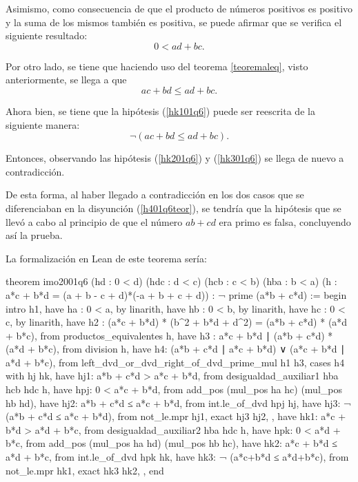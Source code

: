 \begin{demostracion}
\begin{itemize}
    Asimismo, como consecuencia de que el producto de números positivos
    es positivo y la suma de los mismos también es positiva, se puede
    afirmar que se verifica el siguiente resultado:
    \begin{equation}
      0<ad+bc.
    \end{equation}

    Por otro lado, se tiene que haciendo uso del teorema \ref{teoremaleq},
    visto anteriormente, se llega a que
    \begin{equation}\tag{hk2}\label{hk201q6}
      ac+bd≤ad+bc.
    \end{equation}

    Ahora bien, se tiene que la hipótesis (\ref{hk101q6}) puede ser
    reescrita de la siguiente manera:
    \begin{equation}\tag{hk3}\label{hk301q6}
      ¬(ac+bd≤ad+bc).
    \end{equation}

    Entonces, observando las hipótesis (\ref{hk201q6}) y (\ref{hk301q6}) se
    llega de nuevo a contradicción.
  \end{itemize}

  De esta forma, al haber llegado a contradicción en los dos casos que se
  diferenciaban en la disyunción (\ref{h401q6teor}), se tendría que la
  hipótesis que se llevó a cabo al principio de que el número \(ab+cd\) era
  primo es falsa, concluyendo así la prueba.
\end{demostracion}

La formalización en Lean de este teorema sería:
\begin{leancode}
theorem imo2001q6
  (hd  : 0 < d)
  (hdc : d < c)
  (hcb : c < b)
  (hba : b < a)
  (h : a*c + b*d = (a + b - c + d)*(-a + b + c + d))
  : ¬ prime (a*b + c*d) :=
begin
  intro h1,
  have ha : 0 < a,
    by linarith,
  have hb : 0 < b,
    by linarith,
  have hc : 0 < c,
    by linarith,
  have h2 : (a*c + b*d) * (b^2 + b*d + d^2) =
            (a*b + c*d) * (a*d + b*c),
    from productos_equivalentes h,
  have h3 : a*c + b*d ∣ (a*b + c*d) * (a*d + b*c),
    from division h,
  have h4: (a*b + c*d ∣ a*c + b*d) ∨ (a*c + b*d  ∣ a*d + b*c),
    from left_dvd_or_dvd_right_of_dvd_prime_mul h1 h3,
  cases h4 with hj hk,
  { have hj1: a*b + c*d > a*c + b*d,
      from desigualdad_auxiliar1 hba hcb hdc h,
    have hpj: 0 < a*c + b*d,
      from add_pos (mul_pos ha hc) (mul_pos hb hd),
    have hj2: a*b + c*d ≤ a*c + b*d,
      from int.le_of_dvd hpj hj,
    have hj3: ¬ (a*b + c*d ≤ a*c + b*d),
      from not_le.mpr hj1,
    exact hj3 hj2, },
  { have hk1: a*c + b*d > a*d + b*c,
      from desigualdad_auxiliar2 hba hdc h,
    have hpk: 0 < a*d + b*c,
      from add_pos (mul_pos ha hd) (mul_pos hb hc),
    have hk2: a*c + b*d ≤ a*d + b*c,
      from int.le_of_dvd hpk hk,
    have hk3: ¬ (a*c+b*d ≤  a*d+b*c),
      from not_le.mpr hk1,
    exact hk3 hk2, },
end
\end{leancode}

